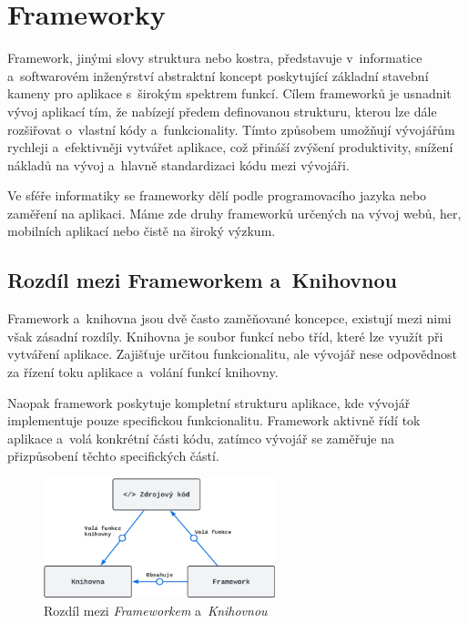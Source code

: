 \section{Frameworky}
\label{sec:dev-framework}
Framework, jinými slovy struktura nebo kostra, představuje v~informatice a~softwarovém inženýrství abstraktní koncept poskytující základní stavební kameny pro aplikace s~širokým spektrem funkcí. Cílem frameworků je usnadnit vývoj aplikací tím, že nabízejí předem definovanou strukturu, kterou lze dále rozšiřovat o~vlastní kódy a~funkcionality. Tímto způsobem umožňují vývojářům rychleji a~efektivněji vytvářet aplikace, což přináší zvýšení produktivity, snížení nákladů na vývoj a~hlavně standardizaci kódu mezi vývojáři.

Ve sféře informatiky se frameworky dělí podle programovacího jazyka nebo zaměření na aplikaci. Máme zde druhy frameworků určených na vývoj webů, her, mobilních aplikací nebo čistě na široký výzkum. \cite{about_framework}

\subsection*{Rozdíl mezi Frameworkem a~Knihovnou}
Framework a~knihovna jsou dvě často zaměňované koncepce, existují mezi nimi však zásadní rozdíly. Knihovna je soubor funkcí nebo tříd, které lze využít při vytváření aplikace. Zajišťuje určitou funkcionalitu, ale vývojář nese odpovědnost za řízení toku aplikace a~volání funkcí knihovny.

Naopak framework poskytuje kompletní strukturu aplikace, kde vývojář implementuje pouze specifickou funkcionalitu. Framework aktivně řídí tok aplikace a~volá konkrétní části kódu, zatímco vývojář se zaměřuje na přizpůsobení těchto specifických částí.

\begin{figure}[H]
    \centering
    \includegraphics[width=0.6\textwidth]{diagrams/frameworkLibraryDiff}
    \caption{Rozdíl mezi \textit{Frameworkem} a~\textit{Knihovnou} \cite{framework_library_difference}}
    \label{fig:framework_library_difference}
\end{figure}

